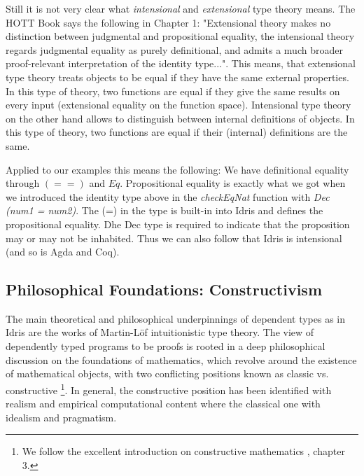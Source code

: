 Still it is not very clear what \textit{intensional} and \textit{extensional} type theory means. The HOTT Book \cite{program_homotopy_2013} says the following in Chapter 1: "Extensional theory makes no distinction between judgmental and propositional equality, the intensional theory regards judgmental equality as purely definitional, and admits a much broader proof-relevant interpretation of the identity type...". This means, that extensional type theory treats objects to be equal if they have the same external properties. In this type of theory, two functions are equal if they give the same results on every input (extensional equality on the function space). Intensional type theory on the other hand allows to distinguish between internal definitions of objects. In this type of theory, two functions are equal if their (internal) definitions are the same.


Applied to our examples this means the following: We have definitional equality through $(==)$ and $Eq$. Propositional equality is exactly what we got when we introduced the identity type above in the \textit{checkEqNat} function with \textit{Dec (num1 = num2)}. The (=) in the type is built-in into Idris and defines the propositional equality. Dhe Dec type is required to indicate that the proposition may or may not be inhabited. Thus we can also follow that Idris is intensional (and so is Agda and Coq).

\subsection{Philosophical Foundations: Constructivism}
\label{sub:dep_foundations}

The main theoretical and philosophical underpinnings of dependent types as in Idris are the works of Martin-L\"of intuitionistic type theory. The view of dependently typed programs to be proofs is rooted in a deep philosophical discussion on the foundations of mathematics, which revolve around the existence of mathematical objects, with two conflicting positions known as classic vs. constructive \footnote{We follow the excellent introduction on constructive mathematics \cite{thompson_type_1991}, chapter 3.}. In general, the constructive position has been identified with realism and empirical computational content where the classical one with idealism and pragmatism.

